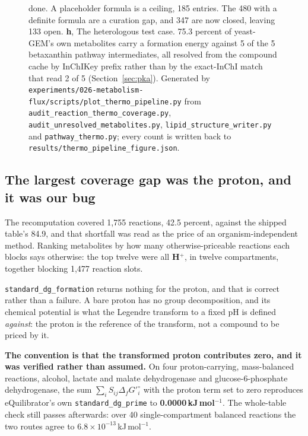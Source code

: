\begin{figure}[!htbp]
{  done. A placeholder formula is a ceiling, 185 entries. The 480 with a definite formula
  are a curation gap, and 347 are now closed, leaving 133 open.
  \textbf{h}, The heterologous test case. 75.3 percent of yeast-GEM's own metabolites carry
  a formation energy against 5 of the 5 betaxanthin pathway intermediates, all resolved from
  the compound cache by InChIKey prefix rather than by the exact-InChI match that read 2 of
  5 (Section~\ref{sec:pka}).
  Generated by \texttt{experiments/026-metabolism-flux/scripts/plot\_thermo\_pipeline.py}
  from \texttt{audit\_reaction\_thermo\_coverage.py}, \texttt{audit\_unresolved\_metabolites.py},
  \texttt{lipid\_structure\_writer.py} and \texttt{pathway\_thermo.py}; every count is
  written back to \texttt{results/thermo\_pipeline\_figure.json}.}
  \label{fig:thermo-pipeline}
\end{figure}

\subsection{The largest coverage gap was the proton, and it was our bug}

The recomputation covered 1{,}755 reactions, 42.5 percent, against the shipped table's 84.9,
and that shortfall was read as the price of an organism-independent method. Ranking
metabolites by how many otherwise-priceable reactions each blocks says otherwise: the top
twelve were all \textbf{H$^+$}, in twelve compartments, together blocking 1{,}477 reaction
slots.

\texttt{standard\_dg\_formation} returns nothing for the proton, and that is correct rather
than a failure. A bare proton has no group decomposition, and its chemical potential is
what the Legendre transform to a fixed pH is defined \emph{against}: the proton is the
reference of the transform, not a compound to be priced by it.

\textbf{The convention is that the transformed proton contributes zero, and it was verified
rather than assumed.} On four proton-carrying, mass-balanced reactions, alcohol, lactate and
malate dehydrogenase and glucose-6-phosphate dehydrogenase, the sum
$\sum_i S_{ij}\Delta_f G'^\circ_i$ with the proton term set to zero reproduces
eQuilibrator's own \texttt{standard\_dg\_prime} to \textbf{0.0000\,kJ\,mol$^{-1}$}. The
whole-table check still passes afterwards: over 40 single-compartment balanced reactions the
two routes agree to $6.8\times10^{-13}$\,kJ\,mol$^{-1}$.

